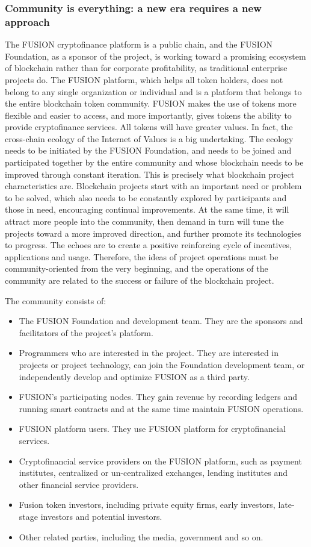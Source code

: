 \documentclass[a4paper,12pt]{article}
\begin{document}
\subsubsection{Community is everything: a new era requires a new approach}

The FUSION cryptofinance platform is a public chain, and the FUSION Foundation, as a sponsor of the project, is working toward a promising ecosystem of blockchain rather than for corporate profitability, as traditional enterprise projects do. The FUSION platform, which helps all token holders, does not belong to any single organization or individual and is a platform that belongs to the entire blockchain token community. FUSION makes the use of tokens more flexible and easier to access, and more importantly, gives tokens the ability to provide cryptofinance services. All tokens will have greater values. In fact, the cross-chain ecology of the Internet of Values is a big undertaking. The ecology needs to be initiated by the FUSION Foundation, and needs to be joined and participated together by the entire community and whose blockchain needs to be improved through constant iteration. This is precisely what blockchain project characteristics are. Blockchain projects start with an important need or problem to be solved, which also needs to be constantly explored by participants and those in need, encouraging continual improvements. At the same time, it will attract more people into the community, then demand in turn will tune the projects toward a more improved direction, and further promote its technologies to progress. The echoes are to create a positive reinforcing cycle of incentives, applications and usage. Therefore, the ideas of project operations must be community-oriented from the very beginning, and the operations of the community are related to the success or failure of the blockchain project.

The community consists of:
\begin{itemize} [itemindent = 1em]
\item The FUSION Foundation and development team. They are the sponsors and facilitators of the project's platform.
\item Programmers who are interested in the project. They are interested in projects or project technology, can join the Foundation development team, or independently develop and optimize FUSION as a third party.
\item FUSION's participating nodes. They gain revenue by recording ledgers and running smart contracts and at the same time maintain FUSION operations.
\item FUSION platform users. They use FUSION platform for cryptofinancial services.
\item Cryptofinancial service providers on the FUSION platform, such as payment institutes, centralized or un-centralized exchanges, lending institutes and other financial service providers.
\item Fusion token investors, including private equity firms, early investors, late-stage investors and potential investors.
\item Other related parties, including the media, government and so on.
\end{itemize}
\end{document}
